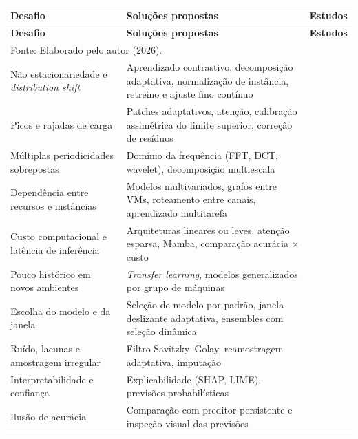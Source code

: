 {\footnotesize
\setlength{\tabcolsep}{4pt}
\renewcommand{\arraystretch}{1.2}
\begin{longtable}{p{3.5cm}p{7.2cm}p{4.4cm}}
\toprule
\textbf{Desafio} & \textbf{Soluções propostas} & \textbf{Estudos} \\
\midrule
\endfirsthead
\toprule
\textbf{Desafio} & \textbf{Soluções propostas} & \textbf{Estudos} \\
\midrule
\endhead
\bottomrule
\multicolumn{3}{l}{Fonte: Elaborado pelo autor (2026).}\\
\endlastfoot
Não estacionariedade e \textit{distribution shift} & Aprendizado contrastivo, decomposição adaptativa, normalização de instância, retreino e ajuste fino contínuo & \cite{lin2025a,lv2026,zheng2027,zhang2026b,lin2025c} \\
Picos e rajadas de carga & Patches adaptativos, atenção, calibração assimétrica do limite superior, correção de resíduos & \cite{zhao2026,jin2026,sanikal2026,ye2024} \\
Múltiplas periodicidades sobrepostas & Domínio da frequência (FFT, DCT, wavelet), decomposição multiescala & \cite{ye2025,lin2025b,zhang2026a,pandeeswari2026,liu2026} \\
Dependência entre recursos e instâncias & Modelos multivariados, grafos entre VMs, roteamento entre canais, aprendizado multitarefa & \cite{shetty2023,shi2026,mahbub2026,huang2025} \\
Custo computacional e latência de inferência & Arquiteturas lineares ou leves, atenção esparsa, Mamba, comparação acurácia $\times$ custo & \cite{ye2025,suo2025,bhatia2025,xie2026,denovi2026,mamushiane2025} \\
Pouco histórico em novos ambientes & \textit{Transfer learning}, modelos generalizados por grupo de máquinas & \cite{rossi2025,denovi2026,singh2024} \\
Escolha do modelo e da janela & Seleção de modelo por padrão, janela deslizante adaptativa, ensembles com seleção dinâmica & \cite{christofidi2023b,lavanya2024,kang2024,bao2022} \\
Ruído, lacunas e amostragem irregular & Filtro Savitzky--Golay, reamostragem adaptativa, imputação & \cite{azarian2025,song2026,lin2025c} \\
Interpretabilidade e confiança & Explicabilidade (SHAP, LIME), previsões probabilísticas & \cite{bawa2026,rossi2025} \\
Ilusão de acurácia & Comparação com preditor persistente e inspeção visual das previsões & \cite{christofidi2023a,jin2026} \\
\end{longtable}
}

